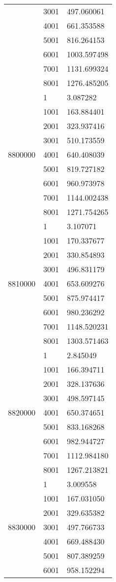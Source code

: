 \begin{table}[htb!]
\begin{tabular}{lll}
 & 3001 & 497.060061 \\
 & 4001 & 661.353588 \\
 & 5001 & 816.264153 \\
 & 6001 & 1003.597498 \\
 & 7001 & 1131.699324 \\
 & 8001 & 1276.485205 \\
\multirow[c]{9}{*}{8800000} & 1 & 3.087282 \\
 & 1001 & 163.884401 \\
 & 2001 & 323.937416 \\
 & 3001 & 510.173559 \\
 & 4001 & 640.408039 \\
 & 5001 & 819.727182 \\
 & 6001 & 960.973978 \\
 & 7001 & 1144.002438 \\
 & 8001 & 1271.754265 \\
\multirow[c]{9}{*}{8810000} & 1 & 3.107071 \\
 & 1001 & 170.337677 \\
 & 2001 & 330.854893 \\
 & 3001 & 496.831179 \\
 & 4001 & 653.609276 \\
 & 5001 & 875.974417 \\
 & 6001 & 980.236292 \\
 & 7001 & 1148.520231 \\
 & 8001 & 1303.571463 \\
\multirow[c]{9}{*}{8820000} & 1 & 2.845049 \\
 & 1001 & 166.394711 \\
 & 2001 & 328.137636 \\
 & 3001 & 498.597145 \\
 & 4001 & 650.374651 \\
 & 5001 & 833.168268 \\
 & 6001 & 982.944727 \\
 & 7001 & 1112.984180 \\
 & 8001 & 1267.213821 \\
\multirow[c]{9}{*}{8830000} & 1 & 3.009558 \\
 & 1001 & 167.031050 \\
 & 2001 & 329.635382 \\
 & 3001 & 497.766733 \\
 & 4001 & 669.488430 \\
 & 5001 & 807.389259 \\
 & 6001 & 958.152294 \\

\end{tabular}
\end{table}
